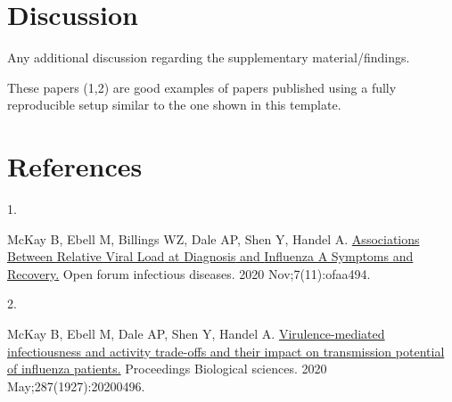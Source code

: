 \documentclass[
  letterpaper,
  DIV=11,
  numbers=noendperiod]{scrartcl}
\newlength{\cslhangindent}
\newlength{\csllabelwidth}
\newlength{\cslentryspacingunit} %
\newenvironment{CSLReferences}[2] %
 {%
  \setlength{\parindent}{0pt}
  \ifodd #1
  \let\oldpar\par
  \def\par{\hangindent=\cslhangindent\oldpar}
  \fi
  \setlength{\parskip}{#2\cslentryspacingunit}
 }%
 {}
\newcommand{\CSLLeftMargin}[1]{\parbox[t]{\csllabelwidth}{#1}}
\newcommand{\CSLRightInline}[1]{\parbox[t]{\linewidth - \csllabelwidth}{#1}\break}
\begin{document}
\hypertarget{discussion}{%
\section{Discussion}\label{discussion}}

Any additional discussion regarding the supplementary material/findings.

These papers (1,2) are good examples of papers published using a fully
reproducible setup similar to the one shown in this template.

\newpage{}

\hypertarget{references}{%
\section*{References}\label{references}}

\hypertarget{refs}{}
\begin{CSLReferences}{0}{0}
\leavevmode{}%
\CSLLeftMargin{1. }%
\CSLRightInline{McKay B, Ebell M, Billings WZ, Dale AP, Shen Y, Handel
A. \href{https://doi.org/10.1093/ofid/ofaa494}{Associations {Between
Relative Viral Load} at {Diagnosis} and {Influenza A Symptoms} and
{Recovery}.} Open forum infectious diseases. 2020 Nov;7(11):ofaa494. }

\leavevmode{}%
\CSLLeftMargin{2. }%
\CSLRightInline{McKay B, Ebell M, Dale AP, Shen Y, Handel A.
\href{https://doi.org/10.1098/rspb.2020.0496}{Virulence-mediated
infectiousness and activity trade-offs and their impact on transmission
potential of influenza patients.} Proceedings Biological sciences. 2020
May;287(1927):20200496. }

\end{CSLReferences}
\end{document}
